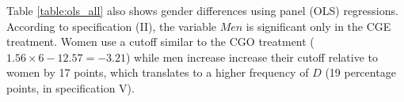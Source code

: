 \documentclass[12pt, letterpaper]{article}
\theoremstyle{plain}
\begin{document}
Table \ref{table:ols_all} also shows gender differences using panel (OLS) regressions. According to specification (II), the variable $Men$ is significant only in the CGE treatment. Women use a cutoff similar to the CGO treatment ($1.56\times 6-12.57= -3.21$) while men increase increase their cutoff relative to women by 17 points, which translates to a higher frequency of $D$ (19 percentage points, in specification V).
\begin{center}
\begin{figure}[ht]
\centering{}%
\begin{minipage}[t]{0.45\columnwidth}%
%
\end{minipage}%
\begin{minipage}[t]{0.45\columnwidth}%
%

\end{minipage}
\end{figure}
\end{center}
\end{document}
